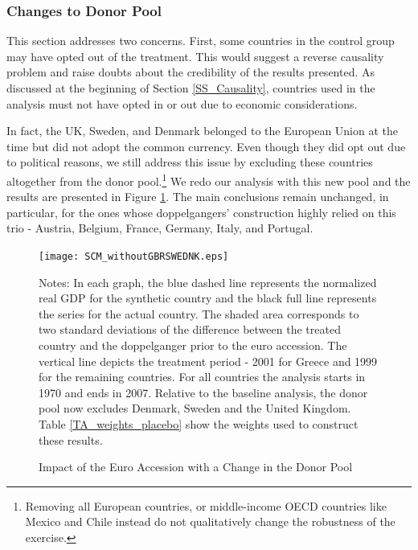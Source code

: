 \documentclass[12pt]{article}
\newcommand{\annote}[1]{\parbox{\textwidth}{\renewcommand{\baselinestretch}{1.0}\vspace{12pt} \small Notes: #1}}
\begin{document}
\subsubsection{Changes to Donor Pool \label{SS_donor}}

This section addresses two concerns. First, some countries in the control group may have opted out of the treatment. This would suggest a reverse causality problem and raise doubts about the credibility of the results presented. As discussed at the beginning of Section \ref{SS_Causality}, countries used in the analysis must not have opted in or out due to economic considerations. 

In fact, the UK, Sweden, and Denmark belonged to the European Union at the time but did not adopt the common currency. Even though they did opt out due to political reasons, we still address this issue by excluding these countries altogether from the donor pool.\footnote{Removing all European countries, or middle-income OECD countries like Mexico and Chile instead do not qualitatively change the robustness of the exercise.} We redo our analysis with this new pool and the results are presented in Figure \ref{F_donor}. The main conclusions remain unchanged, in particular, for the ones whose doppelgangers' construction highly relied on this trio - Austria, Belgium, France, Germany, Italy, and Portugal.


\begin{figure}[h!]
    \centering
    \caption{Impact of the Euro Accession with a Change in the Donor Pool \label{F_donor}}
    \texttt{[image: SCM\_withoutGBRSWEDNK.eps]}
    \annote{In each graph, the blue dashed line represents the normalized real GDP for the synthetic country and the black full line represents the series for the actual country. The shaded area corresponds to two standard deviations of the difference between the treated country and the doppelganger prior to the euro accession. The vertical line depicts the treatment period - 2001 for Greece and 1999 for the remaining countries. For all countries the analysis starts in 1970 and ends in 2007. Relative to the baseline analysis, the donor pool now excludes Denmark, Sweden and the United Kingdom. Table \ref{TA_weights_placebo} show the weights used to construct these results.}
\end{figure}
\end{document}
